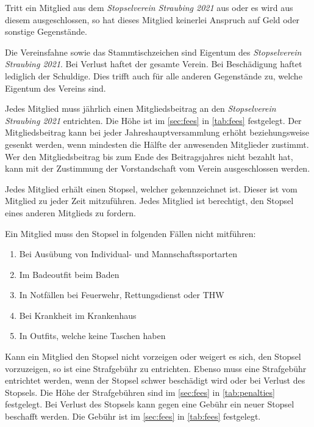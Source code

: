 \documentclass[a4paper,12pt]{scrartcl}
\newcommand{\vereinsName}{Stopselverein Straubing 2021}
\begin{document}
    Tritt ein Mitglied aus dem \emph{\vereinsName} aus oder es wird aus diesem ausgeschlossen,
    so hat dieses Mitglied keinerlei Anspruch auf Geld oder sonstige Gegenstände.

    Die Vereinsfahne sowie das Stammtischzeichen sind Eigentum des \emph{\vereinsName}.
    Bei Verlust haftet der gesamte Verein.
    Bei Beschädigung haftet lediglich der Schuldige.
    Dies trifft auch für alle anderen Gegenstände zu, welche Eigentum des Vereins sind.

    Jedes Mitglied muss jährlich einen Mitgliedsbeitrag an den \emph{\vereinsName} entrichten.
    Die Höhe ist im \autoref{sec:fees} in \autoref{tab:fees} festgelegt.
    Der Mitgliedsbeitrag kann bei jeder Jahreshauptversammlung erhöht beziehungsweise gesenkt werden,
    wenn mindesten die Hälfte der anwesenden Mitglieder zustimmt.
    Wer den Mitgliedsbeitrag bis zum Ende des Beitragsjahres nicht bezahlt hat,
    kann mit der Zustimmung der Vorstandschaft vom Verein ausgeschlossen werden.

    Jedes Mitglied erhält einen Stopsel, welcher gekennzeichnet ist.
    Dieser ist vom Mitglied zu jeder Zeit mitzuführen.
    Jedes Mitglied ist berechtigt, den Stopsel eines anderen Mitglieds zu fordern.

    Ein Mitglied muss den Stopsel in folgenden Fällen nicht mitführen:
    \begin{enumerate}
        \item Bei Ausübung von Individual- und Mannschaftssportarten
        \item Im Badeoutfit beim Baden
        \item In Notfällen bei Feuerwehr, Rettungsdienst oder THW
        \item Bei Krankheit im Krankenhaus
        \item In Outfits, welche keine Taschen haben
    \end{enumerate}

    Kann ein Mitglied den Stopsel nicht vorzeigen oder weigert es sich,
    den Stopsel vorzuzeigen, so ist eine Strafgebühr zu entrichten.
    Ebenso muss eine Strafgebühr entrichtet werden, wenn der Stopsel schwer beschädigt wird
    oder bei Verlust des Stopsels.
    Die Höhe der Strafgebühren sind im \autoref{sec:fees} in \autoref{tab:penalties} festgelegt.
    Bei Verlust des Stopsels kann gegen eine Gebühr ein neuer Stopsel beschafft werden.
    Die Gebühr ist im \autoref{sec:fees} in \autoref{tab:fees} festgelegt.
\end{document}
